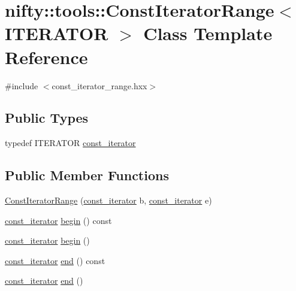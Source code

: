 \hypertarget{classnifty_1_1tools_1_1ConstIteratorRange}{}\section{nifty\+:\+:tools\+:\+:Const\+Iterator\+Range$<$ I\+T\+E\+R\+A\+T\+O\+R $>$ Class Template Reference}
\label{classnifty_1_1tools_1_1ConstIteratorRange}


{\ttfamily \#include $<$const\+\_\+iterator\+\_\+range.\+hxx$>$}

\subsection*{Public Types}
\begin{DoxyCompactItemize}
\item 
typedef I\+T\+E\+R\+A\+T\+O\+R \hyperlink{classnifty_1_1tools_1_1ConstIteratorRange_afb02141878a935f32f828810a2be648b}{const\+\_\+iterator}
\end{DoxyCompactItemize}
\subsection*{Public Member Functions}
\begin{DoxyCompactItemize}
\item 
\hyperlink{classnifty_1_1tools_1_1ConstIteratorRange_a004be230f5b9612f6890e4cceed0ce92}{Const\+Iterator\+Range} (\hyperlink{classnifty_1_1tools_1_1ConstIteratorRange_afb02141878a935f32f828810a2be648b}{const\+\_\+iterator} b, \hyperlink{classnifty_1_1tools_1_1ConstIteratorRange_afb02141878a935f32f828810a2be648b}{const\+\_\+iterator} e)
\item 
\hyperlink{classnifty_1_1tools_1_1ConstIteratorRange_afb02141878a935f32f828810a2be648b}{const\+\_\+iterator} \hyperlink{classnifty_1_1tools_1_1ConstIteratorRange_a8e2cbbe979b889729afbe15e1a005494}{begin} () const 
\item 
\hyperlink{classnifty_1_1tools_1_1ConstIteratorRange_afb02141878a935f32f828810a2be648b}{const\+\_\+iterator} \hyperlink{classnifty_1_1tools_1_1ConstIteratorRange_a58df2f679ea04772b59d8a29401b7fb9}{begin} ()
\item 
\hyperlink{classnifty_1_1tools_1_1ConstIteratorRange_afb02141878a935f32f828810a2be648b}{const\+\_\+iterator} \hyperlink{classnifty_1_1tools_1_1ConstIteratorRange_aba1ec3c080dfdefd327f4b7e293ec81d}{end} () const 
\item 
\hyperlink{classnifty_1_1tools_1_1ConstIteratorRange_afb02141878a935f32f828810a2be648b}{const\+\_\+iterator} \hyperlink{classnifty_1_1tools_1_1ConstIteratorRange_add87b395b12e7ab2724c5ed61f04163f}{end} ()
\end{DoxyCompactItemize}


